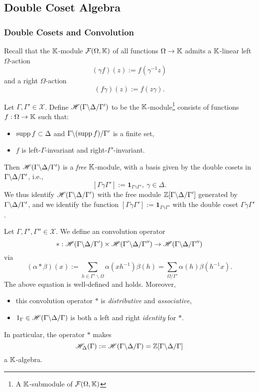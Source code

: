 \subsection{Double Coset Algebra}

\subsubsection{Double Cosets and Convolution}
Recall that the $\mathbb{K}$-module $\mathcal{F}(\Omega, \mathbb{K})$ of all functions $\Omega\to\mathbb{K}$ admits a $\mathbb{K}$-linear left $\Omega$-action\[(\gamma f)(z) := f(\gamma^{-1}z)\]
and a right $\Omega$-action \[(f\gamma)(z) := f(z\gamma).\]
\begin{defthm}
    Let $\Gamma, \Gamma'\in\mathscr{X}$. Define $\mathscr{H}({\Gamma}\backslash {\Delta}\slash {\Gamma'})$
    to be the $\mathbb{K}$-module\footnote{A $\mathbb{K}$-submodule of $\mathcal{F}(\Omega, \mathbb{K})$} consists of functions $f : \Omega\to\mathbb{K}$ such that:
    \begin{itemize}
        \item $\operatorname{supp} f\subset\Delta$ and ${\Gamma}\backslash {(\operatorname{supp}f)}\slash {\Gamma'}$ is a finite set,
        \item $f$ is left-$\Gamma$-invariant and right-$\Gamma'$-invariant.
    \end{itemize}
    Then $\mathscr{H}({\Gamma}\backslash {\Delta}\slash {\Gamma'})$ is a \textit{free} $\mathbb{K}$-module,
    with a basis given by the double cosets in ${\Gamma}\backslash {\Delta}\slash {\Gamma'}$, i.e., \[[\Gamma\gamma\Gamma'] := \boldsymbol{1}_{\Gamma\gamma\Gamma'},\ \gamma\in\Delta.\]
    We thus identify $\mathscr{H}({\Gamma}\backslash {\Delta}\slash {\Gamma'})$ with the free module $\mathbb{Z}[{\Gamma}\backslash {\Delta}\slash {\Gamma'}]$ generated by ${\Gamma}\backslash {\Delta}\slash {\Gamma'}$, and we identify the function $[\Gamma\gamma\Gamma'] := \boldsymbol{1}_{\Gamma\gamma\Gamma'}$ with the double coset $\Gamma\gamma\Gamma'$.
\end{defthm}

\begin{defthm}[Convolution]
    Let $\Gamma, \Gamma', \Gamma''\in\mathscr{X}$.
    We define an convolution operator \[* : \mathscr{H}({\Gamma}\backslash {\Delta}\slash {\Gamma'})\times\mathscr{H}({\Gamma'}\backslash {\Delta}\slash {\Gamma''})\to \mathscr{H}({\Gamma}\backslash {\Delta}\slash {\Gamma''})\]
    via \[(\alpha *\beta)(x) := \sum_{h\in\Gamma'\backslash\Omega} \alpha(xh^{-1})\beta(h) = \sum_{\Omega/\Gamma'}\alpha(h)\beta(h^{-1}x).\]
    The above equation is well-defined and holds.
    Moreover,\begin{itemize}
        \item this convolution operator $*$ is \textit{distributive} and \textit{associative},
        \item $1_{\Gamma}\in\mathscr{H}({\Gamma}\backslash {\Delta}\slash {\Gamma})$ is both a left and right \textit{identity} for $*$.
    \end{itemize}
    In particular, the operator $*$ makes \[\mathscr{H}_\Delta(\Gamma) := \mathscr{H}({\Gamma}\backslash {\Delta}\slash {\Gamma}) = \mathbb{Z}[{\Gamma}\backslash {\Delta}\slash {\Gamma}]\] a $\mathbb{K}$-algebra.
\end{defthm}

